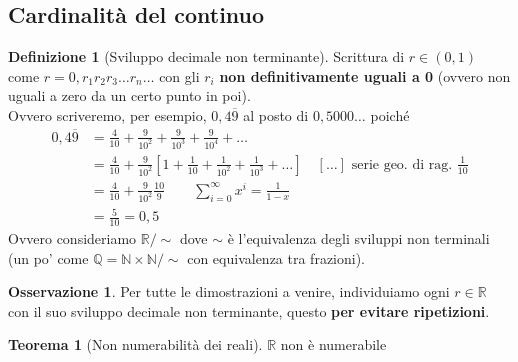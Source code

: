 \documentclass[a4paper,10pt]{article}
\theoremstyle{definition}
\newcommand{\na}{\mathbb{N}} %
\newcommand{\qu}{\mathbb{Q}} %
\newcommand{\re}{\mathbb{R}} %
\theoremstyle{indentdefinition}
\newtheorem{defn}{Definizione}[section]
\theoremstyle{indentpostulate}
\theoremstyle{indenttheorem}
\newtheorem{thm}{Teorema}[section]
\theoremstyle{myremark}
\newtheorem*{rem*}{Osservazione}
\theoremstyle{indentgeneral}
\newenvironment{myboxed} 
{\noindent\begin{lrbox}{\mybox}\begin{minipage}{\textwidth}}
{\end{minipage}\end{lrbox}\fbox{\usebox{\mybox}}}
\begin{document}
\subsection{Cardinalità del continuo}
\begin{defn}[Sviluppo decimale non terminante]
    Scrittura di $r\in(0,1)$ come $r=0,r_1r_2r_3\dots r_n\dots$ con gli $r_i$ \textbf{non definitivamente uguali a 0} (ovvero non uguali a zero da un certo punto in poi).\\
    Ovvero scriveremo, per esempio, $0,4\overline{9}$ al posto di $0,5000\dots$ poiché
    \begin{align*}
        0,4\overline{9}&=\frac{4}{10}+\frac{9}{10^2}+\frac{9}{10^3}+\frac{9}{10^4}+\dots\\
        &=\frac{4}{10}+\frac{9}{10^2}\left[1+\frac{1}{10}+\frac{1}{10^2}+\frac{1}{10^3}+\dots\right]\quad [\dots]\text{ serie geo. di rag. }\frac{1}{10}\\
        &=\frac{4}{10}+\frac{9}{10^2}\frac{10}{9}\qquad\sum_{i=0}^\infty x^i=\frac{1}{1-x}\\
        &=\frac{5}{10}=0,5
    \end{align*}
    Ovvero consideriamo $\re/\sim$ dove $\sim$ è l'equivalenza degli sviluppi non terminali (un po' come $\qu=\na\times\na/\sim$ con equivalenza tra frazioni).
\end{defn}

\begin{rem*}
    Per tutte le dimostrazioni a venire, individuiamo ogni $r\in\re$ con il suo sviluppo decimale non terminante, questo \textbf{per evitare ripetizioni}.
\end{rem*}

\begin{myboxed}
    \begin{thm}[Non numerabilità dei reali]
        $\re$ non è numerabile
    \end{thm}
\end{myboxed}
\end{document}
